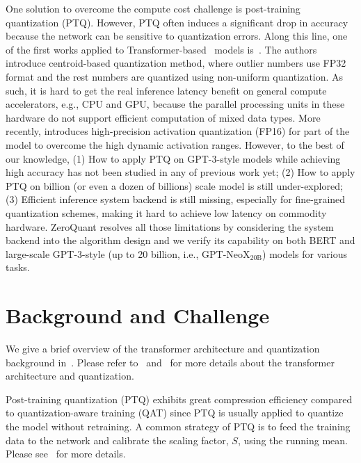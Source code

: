 One solution to overcome the compute cost challenge is post-training quantization (PTQ). However, PTQ often induces a significant drop in accuracy because the network can be sensitive to quantization errors. Along this line, one of the first works applied to Transformer-based~\cite{vaswani2017attention} models is~\cite{zadeh2020gobo}. The authors introduce centroid-based quantization method, where outlier numbers use FP32 format and the rest numbers are quantized using non-uniform quantization. As such, it is hard to get the real inference latency benefit on general compute accelerators, e.g., CPU and GPU, because the parallel processing units in these hardware do not support efficient computation of mixed data types. More recently, \cite{bondarenko2021understanding} introduces high-precision activation quantization (FP16) for part of the model to overcome the high dynamic activation ranges. However, to the best of our knowledge, (1) How to apply PTQ on GPT-3-style models while achieving high accuracy has not been studied in any of previous work yet; (2) How to apply PTQ on billion (or even a dozen of billions) scale model is still under-explored; (3) Efficient inference system backend is still missing, especially for fine-grained quantization schemes, making it hard to achieve low latency on commodity hardware. ZeroQuant resolves all those limitations by considering the system backend into the algorithm design and we verify its capability on both BERT and large-scale GPT-3-style (up to 20 billion, i.e., GPT-NeoX$_{\text{20B}}$) models for various tasks.  

\section{Background and Challenge}
\label{sec:ptq_challenge}

We give a brief overview of the transformer architecture and quantization background in~. 
Please refer to~\cite{vaswani2017attention} and~\cite{gholami2021survey} for more details about the transformer architecture and quantization.

Post-training quantization (PTQ) exhibits great compression efficiency compared to quantization-aware training (QAT) since PTQ is usually applied to quantize the model without retraining. A common strategy of PTQ is to feed the training data to the network and calibrate the scaling factor, $S$, using the running mean. Please see~ for more details.

